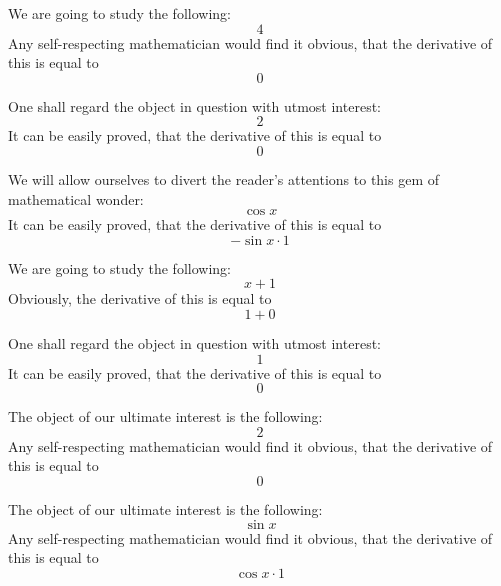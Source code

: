 \documentclass{article}
\begin{document}
We are going to study the following:
\begin{equation}
4 
\end{equation}
Any self-respecting mathematician would find it obvious, that the derivative of this is equal to
\begin{equation}
0 
\end{equation}

One shall regard the object in question with utmost interest:
\begin{equation}
2 
\end{equation}
It can be easily proved, that the derivative of this is equal to
\begin{equation}
0 
\end{equation}

We will allow ourselves to divert the reader's attentions to this gem of mathematical wonder:
\begin{equation}
\cos x 
\end{equation}
It can be easily proved, that the derivative of this is equal to
\begin{equation}
-\sin x \cdot 1 
\end{equation}

We are going to study the following:
\begin{equation}
x + 1 
\end{equation}
Obviously, the derivative of this is equal to
\begin{equation}
1 + 0 
\end{equation}

One shall regard the object in question with utmost interest:
\begin{equation}
1 
\end{equation}
It can be easily proved, that the derivative of this is equal to
\begin{equation}
0 
\end{equation}

The object of our ultimate interest is the following:
\begin{equation}
2 
\end{equation}
Any self-respecting mathematician would find it obvious, that the derivative of this is equal to
\begin{equation}
0 
\end{equation}

The object of our ultimate interest is the following:
\begin{equation}
\sin x 
\end{equation}
Any self-respecting mathematician would find it obvious, that the derivative of this is equal to
\begin{equation}
\cos x \cdot 1 
\end{equation}
\end{document}
